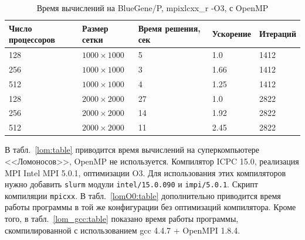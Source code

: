 \documentclass[12pt,notitlepage,oneside]{extarticle}
\begin{document}
\begin{table}[h]
\centering
\caption{Время вычислений на BlueGene/P, mpixlcxx\_r -O3, с OpenMP}
\label{bg_omp:table}
\begin{tabular}{|l|l|l|l|l|}
\textbf{Число процессоров} & \textbf{Размер сетки} & \textbf{Время решения, сек} & \textbf{Ускорение}  & \textbf{Итераций}        \\ \hline
128                        & $1000 \times 1000 $        & 5                      &  1.0                   & 1412                     \\
256                        & $1000 \times 1000 $        & 3                      &  1.66                   & 1412                         \\
512                        & $1000 \times 1000 $        & 4                      &  1.25                  & 1412                         \\ \hline
128                        & $2000 \times 2000 $        & 27                     &  1.0                   & 2822                     \\
256                        & $2000 \times 2000 $        & 14                     &  1.92                   & 2822                         \\
512                        & $2000 \times 2000 $        & 11                     &  2.45                   & 2822
\end{tabular}
\end{table}

В табл.~\ref{lom:table} приводится время вычислений на суперкомпьютере
<<Ломоносов>>, OpenMP не используется. Компилятор ICPC 15.0, реализация MPI
Intel MPI 5.0.1, оптимизации O3. Для использования этих компиляторов нужно
добавить \texttt{slurm} модули \texttt{intel/15.0.090} и \texttt{impi/5.0.1}.
Скрипт компиляции \texttt{mpicxx}. В табл.~\ref{lomO0:table} дополнительно
приводится время работы программы в той же конфигурации без оптимизаций
компилятора. Кроме того, в табл.~\ref{lom_gcc:table} показано
время работы программы, скомпилированной с использованием gcc 4.4.7 + OpenMPI
1.8.4.
\end{document}
